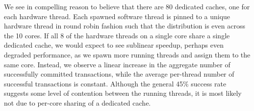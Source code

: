 We see in  compelling reason to believe that
there are 80 dedicated caches, one for each hardware thread. Each spawned
software thread is pinned to a unique hardware thread in round robin fashion
such that the distribution is even across the 10 cores. If all 8 of the
hardware threads on a single core share a single dedicated cache, we would
expect to see sublinear speedup, perhaps even degraded performance, as we spawn
more running threads and assign them to the same core. Instead, we observe a
linear increase in the aggregate number of successfully committed transactions,
while the average per-thread number of successful transactions is constant.
Although the general 45\% success rate suggests some level of contention between
the running threads, it is most likely not due to per-core sharing of a
dedicated cache.
 
